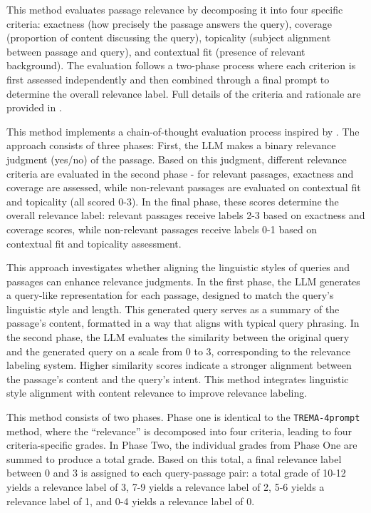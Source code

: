 This method evaluates passage relevance by decomposing it into four specific criteria: exactness (how precisely the passage answers the query), coverage (proportion of content discussing the query), topicality (subject alignment between passage and query), and contextual fit (presence of relevant background). The evaluation follows a two-phase process where each criterion is first assessed independently and then combined through a final prompt to determine the overall relevance label. Full details of the criteria and rationale are provided in \cite{farzi2024best}.

This method implements a chain-of-thought evaluation process inspired by \citet{Sun2023IsCG}. The approach consists of three phases: First, the \ac{LLM} makes a binary relevance judgment (yes/no) of the passage. Based on this judgment, different relevance criteria are evaluated in the second phase - for relevant passages, exactness and coverage are assessed, while non-relevant passages are evaluated on contextual fit and topicality (all scored 0-3). In the final phase, these scores determine the overall relevance label: relevant passages receive labels 2-3 based on exactness and coverage scores, while non-relevant passages receive labels 0-1 based on contextual fit and topicality assessment.

This approach investigates whether aligning the linguistic styles of queries and passages can enhance relevance judgments. In the first phase, the LLM generates a query-like representation for each passage, designed to match the query's linguistic style and length. This generated query serves as a summary of the passage's content, formatted in a way that aligns with typical query phrasing. In the second phase, the LLM evaluates the similarity between the original query and the generated query on a scale from 0 to 3, corresponding to the relevance labeling system. Higher similarity scores indicate a stronger alignment between the passage's content and the query's intent. This method integrates linguistic style alignment with content relevance to improve relevance labeling.

This method consists of two phases. Phase one is identical to the \texttt{TREMA-4prompt} method, where the ``relevance'' is decomposed into four criteria, leading to four criteria-specific grades.  In Phase Two, the individual grades from Phase One are summed to produce a total grade. Based on this total, a final relevance label between 0 and 3 is assigned to each query-passage pair: a total grade of 10-12 yields a relevance label of 3, 7-9 yields a relevance label of 2, 5-6 yields a relevance label of 1, and 0-4 yields a relevance label of 0.

